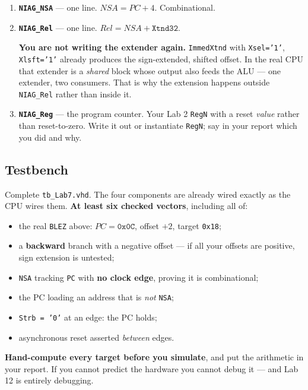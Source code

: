 \documentclass[11pt]{article}
\newcommand{\code}[1]{\texttt{#1}}
\begin{document}
\begin{enumerate}[leftmargin=2em,itemsep=3pt]
\item \textbf{\code{NIAG\_NSA}} --- one line. $NSA = PC + 4$. Combinational.
\item \textbf{\code{NIAG\_Rel}} --- one line. $Rel = NSA + \code{Xtnd32}$.

\textbf{You are not writing the extender again.} \code{ImmedXtnd} with
\code{Xsel='1'}, \code{Xlsft='1'} already produces the sign-extended, shifted
offset. In the real CPU that extender is a \emph{shared} block whose output also
feeds the ALU --- one extender, two consumers. That is why the extension happens
outside \code{NIAG\_Rel} rather than inside it.

\item \textbf{\code{NIAG\_Reg}} --- the program counter. Your Lab 2 \code{RegN}
with a reset \emph{value} rather than reset-to-zero. Write it out or instantiate
\code{RegN}; say in your report which you did and why.
\end{enumerate}

\subsection*{Testbench}

Complete \code{tb\_Lab7.vhd}. The four components are already wired exactly as
the CPU wires them. \textbf{At least six checked vectors}, including all of:

\begin{itemize}[leftmargin=1.4em,itemsep=1pt]
\item the real \code{BLEZ} above: $PC = \code{0x0C}$, offset $+2$, target
\code{0x18};
\item a \textbf{backward} branch with a negative offset --- if all your offsets
are positive, sign extension is untested;
\item \code{NSA} tracking \code{PC} with \textbf{no clock edge}, proving it is
combinational;
\item the PC loading an address that is \emph{not} \code{NSA};
\item \code{Strb = '0'} at an edge: the PC holds;
\item asynchronous reset asserted \emph{between} edges.
\end{itemize}

\textbf{Hand-compute every target before you simulate}, and put the arithmetic
in your report. If you cannot predict the hardware you cannot debug it --- and
Lab 12 is entirely debugging.
\end{document}
